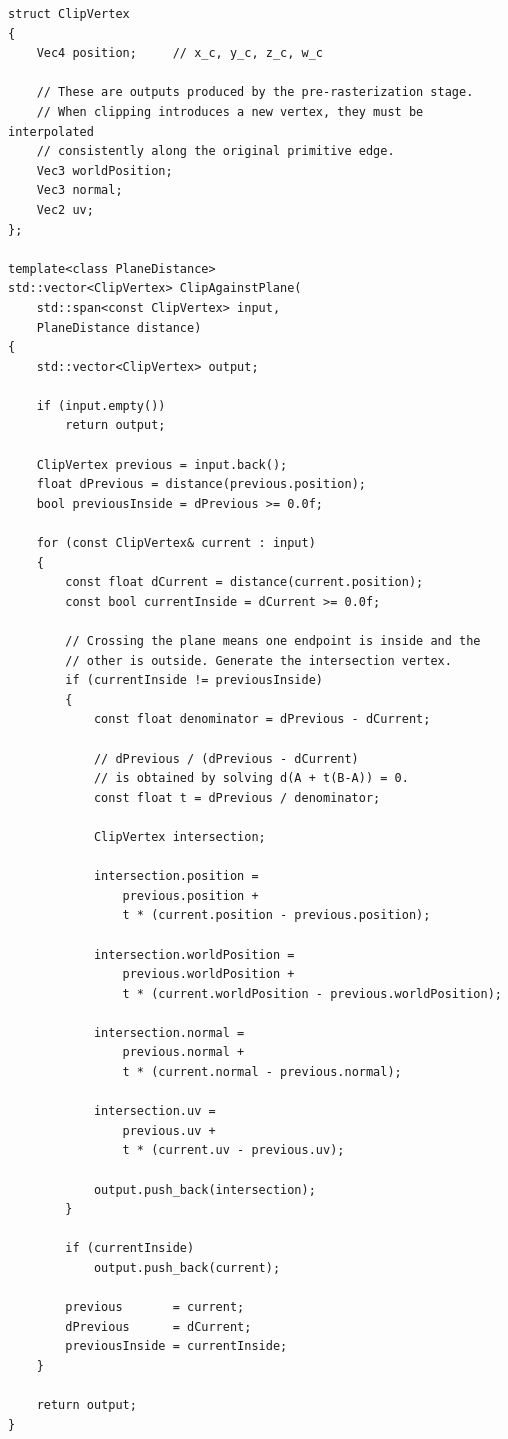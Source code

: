 \begin{verbatim}
struct ClipVertex
{
    Vec4 position;     // x_c, y_c, z_c, w_c

    // These are outputs produced by the pre-rasterization stage.
    // When clipping introduces a new vertex, they must be interpolated
    // consistently along the original primitive edge.
    Vec3 worldPosition;
    Vec3 normal;
    Vec2 uv;
};

template<class PlaneDistance>
std::vector<ClipVertex> ClipAgainstPlane(
    std::span<const ClipVertex> input,
    PlaneDistance distance)
{
    std::vector<ClipVertex> output;

    if (input.empty())
        return output;

    ClipVertex previous = input.back();
    float dPrevious = distance(previous.position);
    bool previousInside = dPrevious >= 0.0f;

    for (const ClipVertex& current : input)
    {
        const float dCurrent = distance(current.position);
        const bool currentInside = dCurrent >= 0.0f;

        // Crossing the plane means one endpoint is inside and the
        // other is outside. Generate the intersection vertex.
        if (currentInside != previousInside)
        {
            const float denominator = dPrevious - dCurrent;

            // dPrevious / (dPrevious - dCurrent)
            // is obtained by solving d(A + t(B-A)) = 0.
            const float t = dPrevious / denominator;

            ClipVertex intersection;

            intersection.position =
                previous.position +
                t * (current.position - previous.position);

            intersection.worldPosition =
                previous.worldPosition +
                t * (current.worldPosition - previous.worldPosition);

            intersection.normal =
                previous.normal +
                t * (current.normal - previous.normal);

            intersection.uv =
                previous.uv +
                t * (current.uv - previous.uv);

            output.push_back(intersection);
        }

        if (currentInside)
            output.push_back(current);

        previous       = current;
        dPrevious      = dCurrent;
        previousInside = currentInside;
    }

    return output;
}
\end{verbatim}

